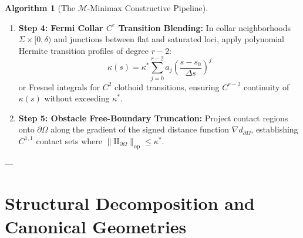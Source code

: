 \documentclass[11pt,reqno]{amsart}
\theoremstyle{definition}
\newtheorem{algorithm}[theorem]{Algorithm}
\providecommand{\II}{\mathrm{I\!I}}
\newcommand{\op}{\mathrm{op}}
\numberwithin{equation}{section}
\providecommand{\II}{\mathrm{II}}
\begin{document}
\begin{algorithm}[The $\mathcal{M}$-Minimax Constructive Pipeline]
\begin{enumerate}
    \item \textbf{Step 4: Fermi Collar $C^r$ Transition Blending:}
    In collar neighborhoods $\Sigma \times [0, \delta)$ and junctions between flat and saturated loci, apply polynomial Hermite transition profiles of degree $r-2$:
    \begin{equation}
    \kappa(s) = \kappa^* \sum_{j=0}^{r-2} a_j \left(\frac{s - s_0}{\Delta s}\right)^j
    \end{equation}
    or Fresnel integrals for $C^2$ clothoid transitions, ensuring $C^{r-2}$ continuity of $\kappa(s)$ without exceeding $\kappa^*$.

    \item \textbf{Step 5: Obstacle Free-Boundary Truncation:}
    Project contact regions onto $\partial\Omega$ along the gradient of the signed distance function $\nabla d_{\partial\Omega}$, establishing $C^{1,1}$ contact sets where $\|\II_{\partial\Omega}\|_{\op} \le \kappa^*$.
\end{enumerate}
\end{algorithm}

---

\section{Structural Decomposition and Canonical Geometries}
\end{document}

